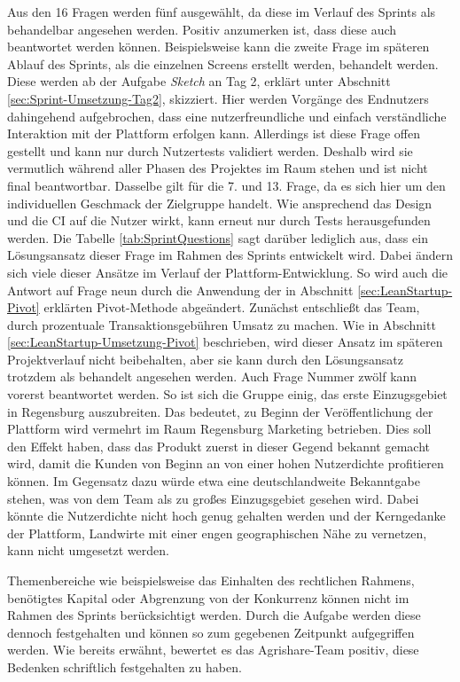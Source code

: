 Aus den 16 Fragen werden fünf ausgewählt, da diese im Verlauf des Sprints als behandelbar angesehen werden. Positiv anzumerken ist, dass diese auch beantwortet werden können. Beispielsweise kann die zweite Frage im späteren Ablauf des Sprints, als die einzelnen Screens erstellt werden, behandelt werden. Diese werden ab der Aufgabe \textit{Sketch} an Tag 2, erklärt unter Abschnitt \ref{sec:Sprint-Umsetzung-Tag2}, skizziert. Hier werden Vorgänge des Endnutzers dahingehend aufgebrochen, dass eine nutzerfreundliche und einfach verständliche Interaktion mit der Plattform erfolgen kann. Allerdings ist diese Frage offen gestellt und kann nur durch Nutzertests validiert werden. Deshalb wird sie vermutlich während aller Phasen des Projektes im Raum stehen und ist nicht final beantwortbar. Dasselbe gilt für die 7. und 13. Frage, da es sich hier um den individuellen Geschmack der Zielgruppe handelt. Wie ansprechend das Design und die \ac{CI} auf die Nutzer wirkt, kann erneut nur durch Tests herausgefunden werden. Die Tabelle \ref{tab:SprintQuestions} sagt darüber lediglich aus, dass ein Lösungsansatz dieser Frage im Rahmen des Sprints entwickelt wird. Dabei ändern sich viele dieser Ansätze im Verlauf der Plattform-Entwicklung. So wird auch die Antwort auf Frage neun durch die Anwendung der in Abschnitt \ref{sec:LeanStartup-Pivot} erklärten Pivot-Methode abgeändert. Zunächst entschließt das Team, durch prozentuale Transaktionsgebühren Umsatz zu machen. Wie in Abschnitt \ref{sec:LeanStartup-Umsetzung-Pivot} beschrieben, wird dieser Ansatz im späteren Projektverlauf nicht beibehalten, aber sie kann durch den Lösungsansatz trotzdem als behandelt angesehen werden. Auch Frage Nummer zwölf kann vorerst beantwortet werden. So ist sich die Gruppe einig, das erste Einzugsgebiet in Regensburg auszubreiten. Das bedeutet, zu Beginn der Veröffentlichung der Plattform wird vermehrt im Raum Regensburg Marketing betrieben. Dies soll den Effekt haben, dass das Produkt zuerst in dieser Gegend bekannt gemacht wird, damit die Kunden von Beginn an von einer hohen Nutzerdichte profitieren können. Im Gegensatz dazu würde etwa eine deutschlandweite Bekanntgabe stehen, was von dem Team als zu großes Einzugsgebiet gesehen wird. Dabei könnte die Nutzerdichte nicht hoch genug gehalten werden und der Kerngedanke der Plattform, Landwirte mit einer engen geographischen Nähe zu vernetzen, kann nicht umgesetzt werden. 

Themenbereiche wie beispielsweise das Einhalten des rechtlichen Rahmens, benötigtes Kapital oder Abgrenzung von der Konkurrenz können nicht im Rahmen des Sprints berücksichtigt werden. Durch die Aufgabe werden diese dennoch festgehalten und können so zum gegebenen Zeitpunkt aufgegriffen werden. Wie bereits erwähnt, bewertet es das Agrishare-Team positiv, diese Bedenken schriftlich festgehalten zu haben.

